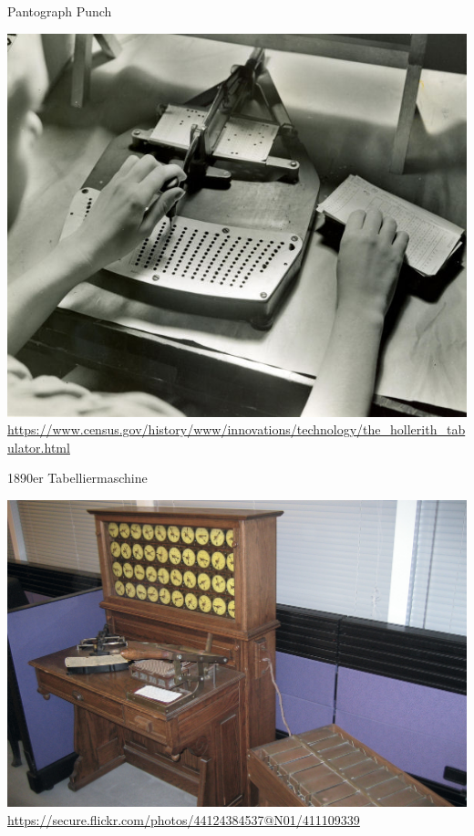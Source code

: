 \documentclass[EU2]{beamer}
\begin{document}
\begin{frame}[plain]{Pantograph Punch}
  \begin{center}
    \includegraphics[height=0.9\textheight]{pantograph}\\
    \tiny{\url{https://www.census.gov/history/www/innovations/technology/the\_hollerith\_tabulator.html}}
  \end{center}
\end{frame}

\begin{frame}[plain]{1890er Tabelliermaschine}
  \begin{center}
    \includegraphics[height=0.9\textheight]{manuell}\\
    \tiny{\url{https://secure.flickr.com/photos/44124384537@N01/411109339}}
  \end{center}
\end{frame}
\end{document}
